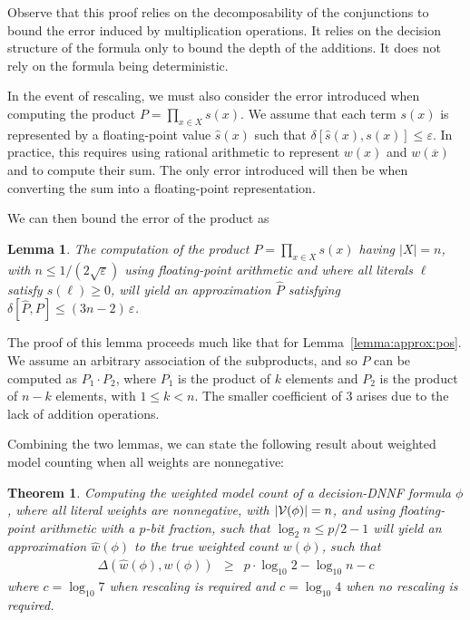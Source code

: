 \documentclass[
hf
]{ceurart}
\newcommand{\obar}[1]{\overline{#1}}
\newcommand{\lit}{\ell}
\newcommand{\approximate}[1]{\hat{#1}}
\newcommand{\approxP}{\approximate{P}}
\newcommand{\approxw}{\approximate{w}}
\newcommand{\approxs}{\approximate{s}}
\newcommand{\aerror}{\delta}
\newcommand{\digitprecision}{\Delta}
\newcommand{\roundepsilon}{\varepsilon}
\newcommand{\varset}{X}
\newcommand{\dependencyset}{{\cal V}}
\newtheorem{theorem}{Theorem}
\newtheorem{lemma}{Lemma}
\begin{document}
Observe that this proof relies on the decomposability of the
conjunctions to bound the error induced by multiplication operations.
It relies on the decision structure of the formula only to bound the
depth of the additions.  It does not rely on the formula being deterministic.

In the event of rescaling, we must also consider the error introduced
when computing the product $P = \prod_{x\in\varset} s(x)$.  We assume that
each term $s(x)$ is represented by a floating-point value
$\approxs(x)$ such that $\aerror[\approxs(x), s(x)] \leq
\roundepsilon$.  In practice, this requires using rational arithmetic
to represent $w(x)$ and $w(\obar{x})$ and to compute their sum.  The
only error introduced will then be when converting the sum into
a floating-point representation.

We can then bound the error of the product as
\begin{lemma}
  The computation of the product $P = \prod_{x\in\varset} s(x)$ having
$|\varset| = n$, with $n \leq 1/(2\sqrt{\roundepsilon})$ using floating-point arithmetic
and where all literals $\ell$ satisfy $s(\lit) \geq 0$,
will yield an approximation $\approxP$ satisfying
  $\aerror[\approxP, P] \leq (3n-2)\,\roundepsilon$.
  \label{lemma:approx:product}
\end{lemma}

The proof of this lemma proceeds much like that for Lemma~\ref{lemma:approx:pos}.  We assume an arbitrary association of the subproducts, and so $P$ can be computed as
$P_1 \cdot P_2$, where $P_1$ is the product of $k$ elements and $P_2$ is the product of $n-k$ elements, with $1 \leq k < n$.
The smaller coefficient of $3$ arises due to the lack of addition operations.

Combining the two lemmas, we can state the following result about weighted model counting when all weights are nonnegative:
\begin{theorem}
  \label{thm:approx:pos}
Computing the weighted model count of
a decision-DNNF formula $\phi$, where all literal weights are nonnegative, with $|\dependencyset(\phi)| = n$, and using floating-point arithmetic with a $p$-bit fraction, such that $\log_2 n \leq p/2-1$
will yield an approximation $\approxw(\phi)$ to the true weighted count $w(\phi)$, such that
\begin{eqnarray}
\digitprecision(\approxw(\phi), w(\phi)) & \geq & p \cdot \log_{10}2 - \log_{10}n - c\label{eqn:precision:wmc}
\end{eqnarray}
where $c = \log_{10} 7$ when rescaling is required and $c = \log_{10} 4$ when no rescaling is required.
\end{theorem}
\end{document}

